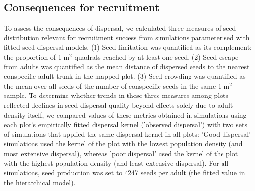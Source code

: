 \documentclass[b5paper,justified]{tufte-book} %
\begin{document}
\begin{fullwidth}
\subsection{Consequences for recruitment}
To assess the consequences of dispersal, we calculated three measures of seed distribution relevant for recruitment success from simulations parameterised with fitted seed dispersal models. (1) Seed limitation was quantified as its complement; the proportion of 1-m$^2$ quadrats reached by at least one seed. (2) Seed escape from adults was quantified as the mean distance of dispersed seeds to the nearest conspecific adult trunk in the mapped plot. (3) Seed crowding was quantified as the mean over all seeds of the number of conspecific seeds in the same 1-m$^2$ sample. To determine whether trends in these three measures among plots reflected declines in seed dispersal quality beyond effects solely due to adult density itself, we compared values of these metrics obtained in simulations using each plot's empirically fitted dispersal kernel ('observed dispersal') with two sets of simulations that applied the same dispersal kernel in all plots: 'Good dispersal' simulations used the kernel of the plot with the lowest population density (and most extensive dispersal), whereas 'poor dispersal' used the kernel of the plot with the highest population density (and least extensive dispersal). For all simulations, seed production was set to 4247 seeds per adult (the fitted value in the hierarchical model).


\end{fullwidth}
\end{document}
